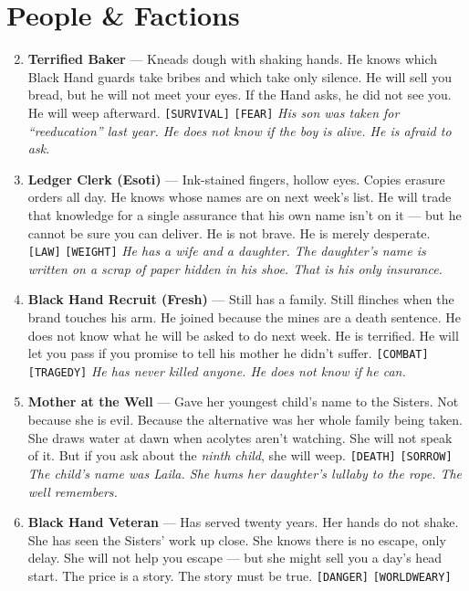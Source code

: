 \section*{ People \& Factions}
\label{sec:ashaan-people}
\begin{enumerate}
\setcounter{enumi}{1}
\item \textbf{Terrified Baker} --- Kneads dough with shaking hands. He knows which Black Hand guards take bribes and which take only silence. He will sell you bread, but he will not meet your eyes. If the Hand asks, he did not see you. He will weep afterward. \texttt{[SURVIVAL]} \texttt{[FEAR]}
  \hfill \textit{His son was taken for ``reeducation'' last year. He does not know if the boy is alive. He is afraid to ask.}
\item \textbf{Ledger Clerk (Esoti)} --- Ink-stained fingers, hollow eyes. Copies erasure orders all day. He knows whose names are on next week's list. He will trade that knowledge for a single assurance that his own name isn't on it --- but he cannot be sure you can deliver. He is not brave. He is merely desperate. \texttt{[LAW]} \texttt{[WEIGHT]}
  \hfill \textit{He has a wife and a daughter. The daughter's name is written on a scrap of paper hidden in his shoe. That is his only insurance.}
\item \textbf{Black Hand Recruit (Fresh)} --- Still has a family. Still flinches when the brand touches his arm. He joined because the mines are a death sentence. He does not know what he will be asked to do next week. He is terrified. He will let you pass if you promise to tell his mother he didn't suffer. \texttt{[COMBAT]} \texttt{[TRAGEDY]}
  \hfill \textit{He has never killed anyone. He does not know if he can.}
\item \textbf{Mother at the Well} --- Gave her youngest child's name to the Sisters. Not because she is evil. Because the alternative was her whole family being taken. She draws water at dawn when acolytes aren't watching. She will not speak of it. But if you ask about the \textit{ninth child}, she will weep. \texttt{[DEATH]} \texttt{[SORROW]}
  \hfill \textit{The child's name was Laila. She hums her daughter's lullaby to the rope. The well remembers.}
\item \textbf{Black Hand Veteran} --- Has served twenty years. Her hands do not shake. She has seen the Sisters' work up close. She knows there is no escape, only delay. She will not help you escape --- but she might sell you a day's head start. The price is a story. The story must be true. \texttt{[DANGER]} \texttt{[WORLDWEARY]}

\end{enumerate}
